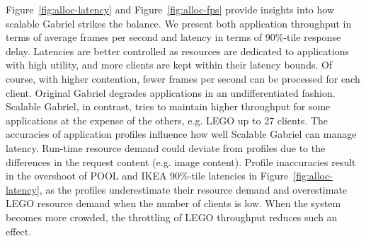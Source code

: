 Figure~\ref{fig:alloc-latency} and Figure~\ref{fig:alloc-fps} provide insights
into how scalable Gabriel strikes the balance. We present both application
throughput in terms of average frames per second and latency in terms of
90\%-tile response delay. Latencies are better controlled as resources are
dedicated to applications with high utility, and more clients are kept within
their latency bounds. Of course, with higher contention, fewer frames per second
can be processed for each client. Original Gabriel degrades applications in an
undifferentiated fashion. Scalable Gabriel, in contrast, tries to maintain
higher throughput for some applications at the expense of the others, e.g. LEGO
up to 27 clients. The accuracies of application profiles influence how well
Scalable Gabriel can manage latency. Run-time resource demand could deviate
from profiles due to the differences in the request content (e.g. image
content). Profile inaccuracies result in the overshoot of POOL and IKEA
90\%-tile latencies in Figure~\ref{fig:alloc-latency}, as the profiles
underestimate their resource demand and overestimate LEGO resource demand when
the number of clients is low. When the system becomes more crowded, the
throttling of LEGO throughput reduces such an effect.


